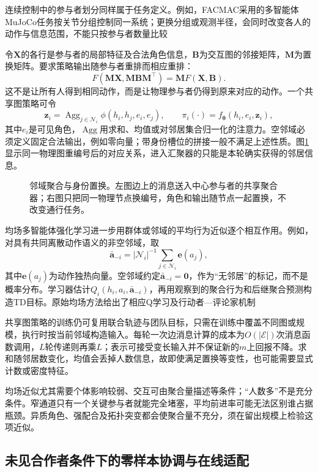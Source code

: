 连续控制中的参与者划分同样属于任务定义。例如，FACMAC采用的多智能体MuJoCo任务按关节分组控制同一系统；更换分组或观测半径，会同时改变各人的动作与信息范围，不能只按参与者数量比较

令$\bm X$的各行是参与者的局部特征及合法角色信息，$\bm B$为交互图的邻接矩阵，$\bm M$为置换矩阵。要求策略输出随参与者重排而相应重排：
\[
 F(\bm M\bm X,\bm M\bm B\bm M^\top)=\bm M F(\bm X,\bm B).
\]
这不是让所有人得到相同动作，而是让物理参与者仍得到原来对应的动作。一个共享图策略可令
\[
 \bm z_i=\operatorname{Agg}_{j\in\mathcal N_i}
           \phi(h_i,h_j,e_i,e_j),\qquad
 \pi_i(\cdot)=f_{\bm\theta}(h_i,e_i,\bm z_i),
\]
其中$e_i$是可见角色，$\operatorname{Agg}$用求和、均值或对邻居集合归一化的注意力。空邻域必须定义固定合法输出，例如零向量；带身份槽位的拼接一般不满足上述性质。图\ref{fig:rl-multi-agent-graph}显示同一物理图重编号后的对应关系，进入汇聚器的只能是本轮确实获得的邻居信息。

\begin{figure}[htbp]
 \centering
 
 \caption{邻域聚合与身份置换。左图边上的消息送入中心参与者的共享聚合器；右图只把同一物理节点换编号，角色和输出随节点一起置换，不改变通行任务。}
 \label{fig:rl-multi-agent-graph}
\end{figure}

均场多智能体强化学习进一步用群体或邻域的平均行为近似逐个相互作用。例如，对具有共同离散动作语义的非空邻域，取
\[
 \bar{\bm a}_{-i}
 =|\mathcal N_i|^{-1}\sum_{j\in\mathcal N_i}\bm e(a_j),
\]
其中$\bm e(a_j)$为动作独热向量。空邻域约定$\bar{\bm a}_{-i}=\bm0$，作为“无邻居”的标记，而不是概率分布。学习器估计$Q_i(h_i,a_i,\bar{\bm a}_{-i})$，再用观察到的聚合行为和后继聚合预测构造TD目标。原始均场方法给出了相应Q学习及行动者—评论家机制

共享图策略的训练仍可复用联合轨迹与团队目标，只需在训练中覆盖不同图或规模，执行时按当前邻域构造输入。每轮一次边消息计算的成本为$O(|\mathcal E|)$次消息函数调用，$L$轮传递则再乘$L$；表示可接受变长输入并不保证新的$m$上回报不降。求和随邻居数变化，均值会丢掉人数信息，故即使满足置换等变性，也可能需要显式计数或密度特征。

均场近似尤其需要个体影响较弱、交互可由聚合量描述等条件；“人数多”不是充分条件。窄通道只有一个关键参与者就能完全堵塞，平均前进率可能无法区别谁占据瓶颈。异质角色、强配合及拓扑突变都会使聚合量不充分，须在留出规模上检验这项近似。

\subsection{未见合作者条件下的零样本协调与在线适配}
\label{sec:rl-multi-agent-new-partners}

